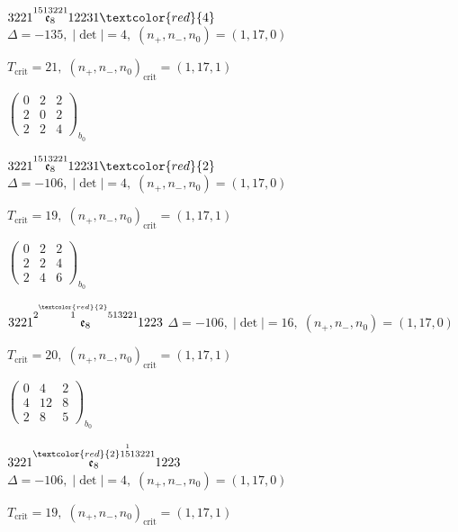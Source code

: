 \documentclass[10pt]{article}
\begin{document}
$3221\overset{1513221}{\mathfrak{e}_8}12231\textcolor{red}{4}$ \quad $\Delta=-135,\; |\det|=4,\; (n_+,n_-,n_0)=(1,17,0)$

\hspace{1em}$T_{\text{crit}}=21,\; (n_+,n_-,n_0)_{\text{crit}}=(1,17,1)$

\hspace{2em}$\left(\begin{smallmatrix}0 & 2 & 2 \\ 2 & 0 & 2 \\ 2 & 2 & 4\end{smallmatrix}\right)_{\!b_0}$

$3221\overset{1513221}{\mathfrak{e}_8}12231\textcolor{red}{2}$ \quad $\Delta=-106,\; |\det|=4,\; (n_+,n_-,n_0)=(1,17,0)$

\hspace{1em}$T_{\text{crit}}=19,\; (n_+,n_-,n_0)_{\text{crit}}=(1,17,1)$

\hspace{2em}$\left(\begin{smallmatrix}0 & 2 & 2 \\ 2 & 2 & 4 \\ 2 & 4 & 6\end{smallmatrix}\right)_{\!b_0}$

\smallskip

$3221\overset{2\overset{\textcolor{red}{2}}{1}513221}{\mathfrak{e}_8}1223$ \quad $\Delta=-106,\; |\det|=16,\; (n_+,n_-,n_0)=(1,17,0)$

\hspace{1em}$T_{\text{crit}}=20,\; (n_+,n_-,n_0)_{\text{crit}}=(1,17,1)$

\hspace{2em}$\left(\begin{smallmatrix}0 & 4 & 2 \\ 4 & 12 & 8 \\ 2 & 8 & 5\end{smallmatrix}\right)_{\!b_0}$

\smallskip

$3221\overset{\textcolor{red}{2}1\overset{1}{5}13221}{\mathfrak{e}_8}1223$ \quad $\Delta=-106,\; |\det|=4,\; (n_+,n_-,n_0)=(1,17,0)$

\hspace{1em}$T_{\text{crit}}=19,\; (n_+,n_-,n_0)_{\text{crit}}=(1,17,1)$
\end{document}
